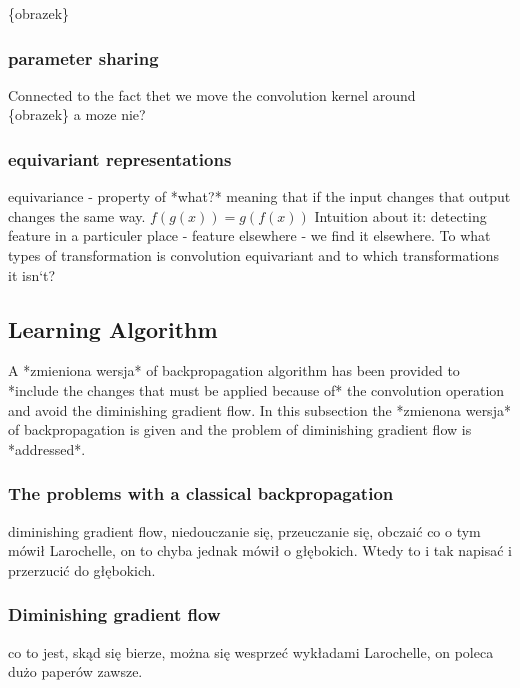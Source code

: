 \documentclass[a4paper,10pt]{report}
\begin{document}
	  \{obrazek\} %
	  
	\subsubsection{parameter sharing} %
	  Connected to the fact thet we move the convolution kernel around \\
	  
	  \{obrazek\} a moze nie?
	  
	\subsubsection{equivariant representations} %
	  equivariance - property of *what?* meaning that if the input changes that output changes the same way. $f(g(x)) = g(f(x))$ Intuition about it: detecting feature in a particuler place - feature elsewhere - we find it elsewhere. To what types of transformation is convolution equivariant and to which transformations it isn`t?\\
      
      \subsection{Learning Algorithm} %
	A *zmieniona wersja* of backpropagation algorithm has been provided to *include the changes that must be applied because of* the convolution operation and avoid the diminishing gradient flow. In this subsection the *zmienona wersja* of backpropagation is given and the problem of diminishing gradient flow is *addressed*.\\
	
	\subsubsection{The problems with a classical backpropagation} %
	  diminishing gradient flow, niedouczanie się, przeuczanie się, obczaić co o tym mówił Larochelle, on to chyba jednak mówił o głębokich. Wtedy to i tak napisać i przerzucić do głębokich.\\
	
	\subsubsection{Diminishing gradient flow} %
	  co to jest, skąd się bierze, można się wesprzeć wykładami Larochelle, on poleca dużo paperów zawsze.\\
	  
\end{document}
